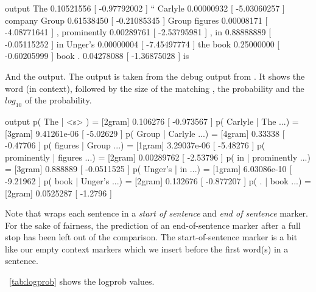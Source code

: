 \documentclass[a4paper,10pt,twoside]{report}
\begin{document}
\begin{wout}{\wopr{} output}
The         0.10521556   [ -0.97792002 ] ``
Carlyle     0.00000932   [ -5.03060257 ] company
Group       0.61538450   [ -0.21085345 ] Group
figures     0.00008171   [ -4.08771641 ] ,
prominently 0.00289761   [ -2.53795981 ] ,
in          0.88888889   [ -0.05115252 ] in
Unger's     0.00000004   [ -7.45497774 ] the
book        0.25000000   [ -0.60205999 ] book
.           0.04278088   [ -1.36875028 ] is
\end{wout}

And the \srilm{} output. The output is taken from the debug output from
\srilm{}. It shows the word (in context), followed by the size of the
matching \ngram{}, the probability and the $log_{10}$ of the probability.

\begin{wout}{\srilm{} output}
p( The | <s> )                = [2gram] 0.106276    [ -0.973567 ]
p( Carlyle | The ...)         = [3gram] 9.41261e-06 [ -5.02629 ]
p( Group | Carlyle ...)       = [4gram] 0.33338     [ -0.47706 ]
p( figures | Group ...)       = [1gram] 3.29037e-06 [ -5.48276 ]
p( prominently | figures ...) = [2gram] 0.00289762  [ -2.53796 ]
p( in | prominently ...)      = [3gram] 0.888889    [ -0.0511525 ]
p( Unger's | in ...)          = [1gram] 6.03086e-10 [ -9.21962 ]
p( book | Unger's ...)        = [2gram] 0.132676    [ -0.877207 ]
p( . | book ...)              = [2gram] 0.0525287   [ -1.2796 ]
\end{wout}

Note that \srilm{} wraps each sentence in a \emph{start of sentence}
and \emph{end of sentence} marker. For the sake of fairness, the
prediction of an end-of-sentence marker after a full stop has been
left out of the comparison. The start-of-sentence marker is a bit like
our empty context markers which we insert before the first word(s) in
a sentence. 

\par
\tablename~\ref{tab:logprob} shows the logprob values.
\end{document}
